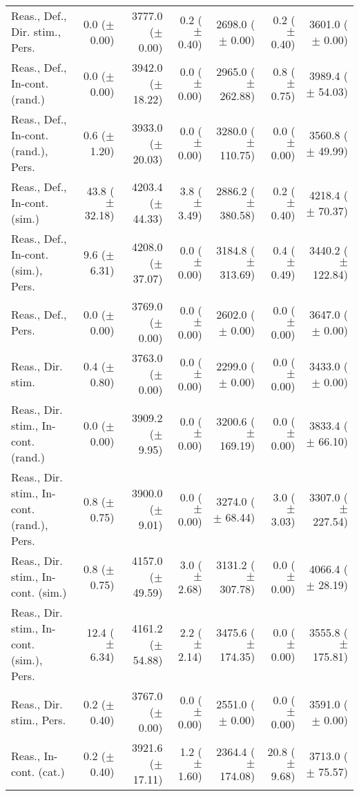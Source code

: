 \begin{table*}
\begin{tabular}{lrrrrrr}
        Reas., Def., Dir. stim., Pers. & 0.0 ($\pm$ 0.00) & 3777.0 ($\pm$ 0.00) & 0.2 ($\pm$ 0.40) & 2698.0 ($\pm$ 0.00) & 0.2 ($\pm$ 0.40) & 3601.0 ($\pm$ 0.00) \\
        Reas., Def., In-cont. (rand.) & 0.0 ($\pm$ 0.00) & 3942.0 ($\pm$ 18.22) & 0.0 ($\pm$ 0.00) & 2965.0 ($\pm$ 262.88) & 0.8 ($\pm$ 0.75) & 3989.4 ($\pm$ 54.03) \\
        Reas., Def., In-cont. (rand.), Pers. & 0.6 ($\pm$ 1.20) & 3933.0 ($\pm$ 20.03) & 0.0 ($\pm$ 0.00) & 3280.0 ($\pm$ 110.75) & 0.0 ($\pm$ 0.00) & 3560.8 ($\pm$ 49.99) \\
        Reas., Def., In-cont. (sim.) & 43.8 ($\pm$ 32.18) & 4203.4 ($\pm$ 44.33) & 3.8 ($\pm$ 3.49) & 2886.2 ($\pm$ 380.58) & 0.2 ($\pm$ 0.40) & 4218.4 ($\pm$ 70.37) \\
        Reas., Def., In-cont. (sim.), Pers. & 9.6 ($\pm$ 6.31) & 4208.0 ($\pm$ 37.07) & 0.0 ($\pm$ 0.00) & 3184.8 ($\pm$ 313.69) & 0.4 ($\pm$ 0.49) & 3440.2 ($\pm$ 122.84) \\
        Reas., Def., Pers. & 0.0 ($\pm$ 0.00) & 3769.0 ($\pm$ 0.00) & 0.0 ($\pm$ 0.00) & 2602.0 ($\pm$ 0.00) & 0.0 ($\pm$ 0.00) & 3647.0 ($\pm$ 0.00) \\
        Reas., Dir. stim. & 0.4 ($\pm$ 0.80) & 3763.0 ($\pm$ 0.00) & 0.0 ($\pm$ 0.00) & 2299.0 ($\pm$ 0.00) & 0.0 ($\pm$ 0.00) & 3433.0 ($\pm$ 0.00) \\
        Reas., Dir. stim., In-cont. (rand.) & 0.0 ($\pm$ 0.00) & 3909.2 ($\pm$ 9.95) & 0.0 ($\pm$ 0.00) & 3200.6 ($\pm$ 169.19) & 0.0 ($\pm$ 0.00) & 3833.4 ($\pm$ 66.10) \\
        Reas., Dir. stim., In-cont. (rand.), Pers. & 0.8 ($\pm$ 0.75) & 3900.0 ($\pm$ 9.01) & 0.0 ($\pm$ 0.00) & 3274.0 ($\pm$ 68.44) & 3.0 ($\pm$ 3.03) & 3307.0 ($\pm$ 227.54) \\
        Reas., Dir. stim., In-cont. (sim.) & 0.8 ($\pm$ 0.75) & 4157.0 ($\pm$ 49.59) & 3.0 ($\pm$ 2.68) & 3131.2 ($\pm$ 307.78) & 0.0 ($\pm$ 0.00) & 4066.4 ($\pm$ 28.19) \\
        Reas., Dir. stim., In-cont. (sim.), Pers. & 12.4 ($\pm$ 6.34) & 4161.2 ($\pm$ 54.88) & 2.2 ($\pm$ 2.14) & 3475.6 ($\pm$ 174.35) & 0.0 ($\pm$ 0.00) & 3555.8 ($\pm$ 175.81) \\
        Reas., Dir. stim., Pers. & 0.2 ($\pm$ 0.40) & 3767.0 ($\pm$ 0.00) & 0.0 ($\pm$ 0.00) & 2551.0 ($\pm$ 0.00) & 0.0 ($\pm$ 0.00) & 3591.0 ($\pm$ 0.00) \\
        Reas., In-cont. (cat.) & 0.2 ($\pm$ 0.40) & 3921.6 ($\pm$ 17.11) & 1.2 ($\pm$ 1.60) & 2364.4 ($\pm$ 174.08) & 20.8 ($\pm$ 9.68) & 3713.0 ($\pm$ 75.57) \\

\end{tabular}
\end{table*}
